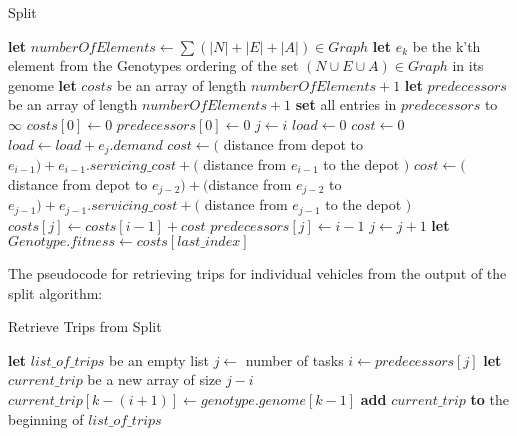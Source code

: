 \begin{algorithm}
\caption{Split}\label{split-pseudocode}
\begin{algorithmic}[1]

	\State \textbf{let} $numberOfElements \leftarrow \sum (|N|+|E|+|A|) \in Graph$
	\State \textbf{let} $e_k$ be the k'th element from the Genotypes ordering of the set $(N \cup E \cup A) \in Graph$ in its genome
	\State \textbf{let} $costs$ be an array of length $numberOfElements + 1$
	\State \textbf{let} $predecessors$ be an array of length $numberOfElements + 1$
	\State \textbf{set} all entries in $predecessors$ to $\infty$
	\State $costs[0] \leftarrow 0$
	\State $predecessors[0] \leftarrow 0$
	\Statex
		\State $j \leftarrow i$
		\State $load \leftarrow 0$
		\State $cost \leftarrow 0$
		\DoWhile
			\State $load \leftarrow load + e_j.demand$
			\Statex
				\State $cost \leftarrow($ distance from depot to $e_{i-1}) + e_{i-1}.servicing\_cost +($ distance from $e_{i-1}$ to the depot $)$
			\Else
				\State $cost \leftarrow($ distance from depot to $e_{j-2}) + ($distance from $e_{j-2}$ to $e_{j-1}) + e_{j-1}.servicing\_cost +($ distance from $e_{j-1}$ to the depot $)$
			\EndIf
			\Statex
				\State $costs[j] \leftarrow costs[i - 1] + cost$
				\State $predecessors[j] \leftarrow i - 1$
			\EndIf
			\Statex
			\State $j \leftarrow j + 1$
	\EndFor
	\Statex
	\State \textbf{let} $Genotype.fitness \leftarrow costs[last\_index]$
\EndProcedure

\end{algorithmic}
\end{algorithm}

The pseudocode for retrieving trips for individual vehicles from the output of the split algorithm:

\begin{algorithm}
\caption{Retrieve Trips from Split}\label{split-retrieve-pseudocode}
\begin{algorithmic}[1]

	\State \textbf{let} $list\_of\_trips$ be an empty list
	\State $j \leftarrow$ number of tasks
	\DoWhile
		\State $i \leftarrow predecessors[j]$
		\State \textbf{let} $current\_trip$ be a new array of size $j - i$
			\State $current\_trip[k-(i+1)] \leftarrow genotype.genome[k-1]$
		\EndFor
		\State \textbf{add} $current\_trip$ \textbf{to} the beginning of $list\_of\_trips$
\EndProcedure

\end{algorithmic}
\end{algorithm}

